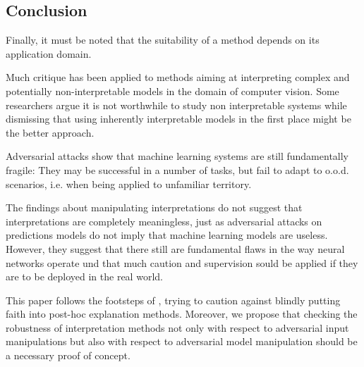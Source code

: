 

\subsection{Conclusion}


Finally, it must be noted that the suitability of a method depends on its application domain. 


Much critique has been applied to methods aiming at interpreting complex and potentially non-interpretable models in the domain of computer vision. Some researchers argue it is not worthwhile to study non interpretable systems while dismissing that using inherently interpretable models in the first place might be the better approach. 

Adversarial attacks show that machine learning systems are still fundamentally fragile: They may be successful in a number of tasks, but fail to adapt to o.o.d. scenarios, i.e. when being applied to unfamiliar territory. 

 The findings about manipulating interpretations do not suggest that interpretations are completely meaningless, just as adversarial attacks on predictions models do not imply that machine learning models are useless. However, they suggest that there still are fundamental flaws in the way neural networks operate und that much caution and supervision sould be applied if they are to be deployed in the real world. 

This paper follows the footsteps of \cite{lipton2018mythos}, trying to caution against blindly putting faith into post-hoc explanation methods. Moreover, we propose that checking the robustness of interpretation methods not only with respect to adversarial input manipulations but also with respect to adversarial model manipulation should be a necessary proof of concept. 


